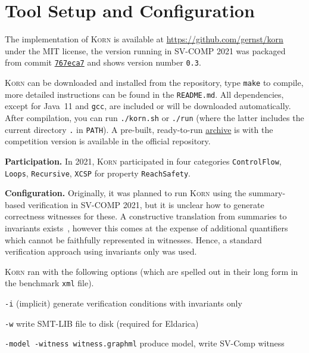\documentclass{llncs}
\newcommand{\Korn}{\textsc{Korn}\xspace}
\begin{document}
\section{Tool Setup and Configuration}
\label{sec:project}

The implementation of \Korn is available at
    \url{https://github.com/gernst/korn} under the MIT license,
the version running in SV-COMP 2021 was packaged from commit
\href{https://github.com/gernst/korn/commit/767eca718edf7f04e995142b679762242c68eef5}{\tt 767eca7}
and shows version number \texttt{0.3}.

\Korn can be downloaded and installed from the repository, type \texttt{make} to compile,
more detailed instructions can be found in the \texttt{README.md}.
All dependencies, except for Java~11 and \texttt{gcc}, are included or will be downloaded automatically.
After compilation, you can run \texttt{./korn.sh} or \texttt{./run}
(where the latter includes the current directory \texttt{.} in \texttt{PATH}).
A pre-built, ready-to-run
\href{https://gitlab.com/gernst/svcomp-archives-2021/-/blob/master/2021/korn.zip}{archive}
is with the competition version is available in the official repository.

\textbf{Participation.} In 2021, \Korn participated in four categories
\texttt{ControlFlow},
\texttt{Loops},
\texttt{Recursive},
\texttt{XCSP}
for property \texttt{ReachSafety}.

\textbf{Configuration.}
Originally, it was planned to run \Korn using the summary-based verification in SV-COMP 2021,
but it is unclear how to generate correctness witnesses for these.
A constructive translation from summaries to invariants exists~\cite[Prop. 1]{ernst:arxiv2020:summaries},
however this comes at the expense of additional quantifiers which cannot be faithfully represented in witnesses.
Hence, a standard verification approach using invariants only was used.

\Korn ran with the following options
(which are spelled out in their long form in the benchmark \texttt{xml} file).

\texttt{-i} (implicit)
    \tabto{2.8cm} generate verification conditions with invariants only

\texttt{-w}
    \tabto{2.8cm} write SMT-LIB file to disk (required for Eldarica)

\smallskip

\texttt{-model -witness witness.graphml}
    produce model, write SV-Comp witness

\smallskip
\end{document}

